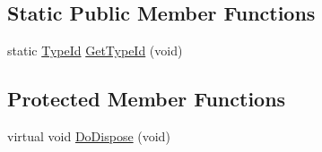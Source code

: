 \subsection*{Static Public Member Functions}
\begin{DoxyCompactItemize}
\item 
static \hyperlink{classns3_1_1TypeId}{Type\+Id} \hyperlink{classns3_1_1MinMaxAvgTotalCalculator_ab67499c5d0c3709e6d3f5ec8937369c2}{Get\+Type\+Id} (void)
\end{DoxyCompactItemize}
\subsection*{Protected Member Functions}
\begin{DoxyCompactItemize}
\item 
virtual void \hyperlink{classns3_1_1MinMaxAvgTotalCalculator_a6552390161b48826a909483dfdc010e1}{Do\+Dispose} (void)
\end{DoxyCompactItemize}
